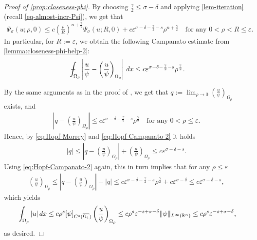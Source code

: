 \documentclass[11pt,reqno]{amsart}
\theoremstyle{plain}
\theoremstyle{definition}
\numberwithin{equation}{section}
\newcommand{\R}{\mathbb{R}}
\newcommand{\eps}{\varepsilon}
\newcommand{\1}{\mathbbm{1}}
\renewcommand{\d}{\textnormal{\,d}}
\newcommand{\average}{{\mathchoice {\kern1ex\vcenter{\hrule height.4pt
width 6pt depth0pt} \kern-9.7pt} {\kern1ex\vcenter{\hrule
height.4pt width 4.3pt depth0pt} \kern-7pt} {} {} }}
\newcommand{\dashint}{\average\int}
\begin{document}
\begin{proof}[Proof of \autoref{prop:closeness-phi}]
By choosing $\frac{\gamma}{2} \le \sigma - \delta$ and applying \autoref{lem-iteration} (recall \eqref{eq-almost-incr-Psi}), we get that
\begin{align*}
    \Psi_{\sigma}(u; \rho, 0) \le c \left( \frac{\rho}{R} \right)^{n+ \frac{\gamma}{2}} \Psi_{\sigma}(u;R,0) + c \eps^{\sigma - \delta - \frac{\gamma}{2} - s} \rho^{n + \frac{\gamma}{2}} \quad\text{for any }0<\rho<R\leq \varepsilon.
\end{align*}
In particular, for $R := \eps$, we obtain the following Campanato estimate from \autoref{lemma:closeness-phi-help-2}:
\begin{align*}
   \dashint_{\Omega_{\rho}} \left|\frac{u}{\psi} - \left( \frac{u}{\psi} \right)_{\Omega_{\rho}} \right| \d x \le c \eps^{\sigma - \delta - \frac{\gamma}{2} - s} \rho^{\frac{\gamma}{2}}.
\end{align*}

By the same arguments as in the proof of \cite[(5.9)]{GiMa12}, we get that $q := \lim_{\rho \to 0} \left(\frac{u}{\psi} \right)_{\Omega_{\rho}}$ exists, and
\begin{align}
\label{eq:Hopf-Campanato-2}
    \left|q - \left( \frac{u}{\psi} \right)_{\Omega_{\rho}}  \right| \le c \eps^{\sigma - \delta - \frac{\gamma}{2} - s }\rho^{\frac{\gamma}{2}} \quad\text{for any }0< \rho \le \eps.
\end{align}
Hence, by \eqref{eq:Hopf-Morrey} and \eqref{eq:Hopf-Campanato-2} it holds
\begin{align*}
    |q| \le \left|q - \left( \frac{u}{\psi} \right)_{\Omega_\rho}  \right| + \left( \frac{u}{\psi} \right)_{\Omega_\rho} \le c \eps^{\sigma - \delta - s}.
\end{align*}
Using \eqref{eq:Hopf-Campanato-2} again, this in turn implies that for any $\rho \leq \varepsilon$
\begin{align*}
    \left( \frac{u}{\psi} \right)_{\Omega_{\rho}} \le  \left|q - \left( \frac{u}{\psi} \right)_{\Omega_{\rho}}  \right| + |q| \le  c \eps^{\sigma - \delta - \frac{\gamma}{2} - s} \rho^{\frac{\gamma}{2}} + c\eps^{\sigma - \delta} \le c \eps^{\sigma - \delta - s},
\end{align*}
which yields
\begin{align*}
    \dashint_{\Omega_{\rho}} |u| \d x \le c \rho^s [\psi]_{C^s(\overline{\Omega_{1}})} \left( \frac{u}{\psi} \right)_{\Omega_{\rho}} \le c \rho^s \eps^{-s+ \sigma - \delta} \Vert \psi \Vert_{L^{\infty}(\R^n)} \le c \rho^s \eps^{-s+ \sigma - \delta},
\end{align*}
as desired.
\end{proof}
\end{document}
